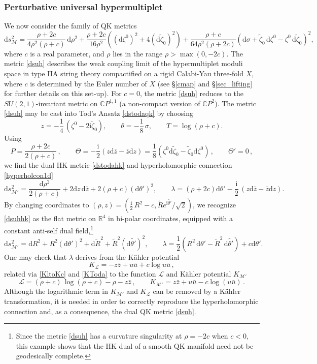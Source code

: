 \documentclass[12pt,reqno]{article}
\numberwithin{equation}{section}
\newcommand{\be}{\begin{equation}}
\newcommand{\ee}{\end{equation}}
\def\({\left(}
\def\){\right)}
\def\hf{\frac{1}{2}}
\def\bz{\bar z}
\def\bu{\bar u}
\renewcommand{\d}{\mathrm{d}}
\newcommand{\de}{\mathrm{d}}
\newcommand{\I}{\mathrm{i}}
\newcommand{\cL}{\mathcal{L}}
\newcommand{\cM}{\mathcal{M}}
\newcommand{\IR}{\mathbb{R}}
\newcommand{\IC}{\mathbb{C}}
\newcommand{\lb}{\mathscr{L}}
\newcommand{\tzeta}{{\tilde\zeta}}
\newcommand{\kahler}{{K\"ahler}\xspace}
\def\sigp{{\theta}}
\def\phip{{\theta'}}
\def\pTheta{\Theta'}
\def\pcM{\cM'}
\def\Kc{K} %
\def\conhyper{\lambda}
\numberwithin{equation}{section}
\begin{document}
\subsubsection*{\bf Perturbative universal hypermultiplet}

We now consider the family of QK metrics  \cite{Antoniadis:2003sw}
\be
\label{dsuh}
\de s^2_\cM = \frac{\rho+2c}{4\rho^2(\rho+c)}\,\de \rho^2
+\frac{\rho+2c}{16 \rho^2} \( (\d\zeta^0)^2+4 (\de\tzeta_0)^2\)
+ \frac{\rho+c}{64 \rho^2(\rho+2c)} (\de\sigma+\tzeta_0\,\de\zeta^0- \zeta^0\, \de\tzeta_0)^2 ,
\ee
where $c$ is a real parameter, and $\rho$ lies in the range $\rho>\max(0,-2c)$.
The metric \eqref{dsuh} describes the weak coupling limit of the hypermultiplet moduli
space in type IIA string theory compactified on a rigid Calabi-Yau three-fold $X$,
where $c$ is determined by the Euler number of $X$
(see \S\ref{cmap} and \S\ref{sec_lifting} for further details on this set-up). For $c=0$,
the metric \eqref{dsuh} reduces to the $SU(2,1)$-invariant metric
on $\IC P^{1,1}$ (a non-compact version of $\IC P^2$).
The metric \eqref{dsuh} may be cast into Tod's Ansatz \eqref{dstodaqk}
by choosing
\be
\label{TodaUH}
z=-\frac14\,(\zeta^0-2\I\tzeta_0),
\qquad
\sigp=-\frac18\, \sigma ,
\qquad
T=\log(\rho +c) .
\ee
Using
\be
P=\frac{\rho+2c}{2(\rho+c)}\, ,
\qquad
\Theta=-\frac{\I}{2} ( z \de \bar z - \bar z \de z)=\frac18(\zeta^0\de\tzeta_0-\tzeta_0\de\zeta^0)\, ,
\qquad
\pTheta=0\, ,
\ee
we find the dual HK metric \eqref{dstodahk} and hyperholomorphic connection
\eqref{hyperholcon1d}
\be
\label{dsuhhk}
\de s_{\pcM}^2 = \frac{\de\rho^2}{2(\rho+c)}+2\de z\,\de\bz+2(\rho+c)(\de\phip)^2,
\qquad
\conhyper = (\rho+2c) \de \phip   -\frac{\I}{2}\, ( z \de \bar z - \bar z \de z) .
\ee
By changing coordinates to $(\rho,z)=(\hf\, R^2-c,\tilde R e^{\I\tilde\phip}/\sqrt{2})$, we recognize
\eqref{dsuhhk} as the flat metric on $\IR^4$ in bi-polar coordinates, equipped
with a constant anti-self dual field,\footnote{Since the metric \eqref{dsuh} has a curvature
singularity at $\rho=-2c$ when $c<0$, this example shows that the HK dual of a smooth
QK manifold need not be geodesically complete.}
\be
\label{UHflat}
\de s^2_{\pcM}=\de R^2+R^2(\de\phip)^2+\de \tilde R^2+\tilde R^2(\de \tilde\phip)^2,
\qquad
\conhyper=\hf\( R^2\, \de\phip-\tilde R^2\, \de\tilde\phip\)+c \de\phip .
\ee
One may check that $\lambda$ derives from the K\"ahler potential
\be
K_{\lb}=-z\bar z+u\bu +c\log u\bu\, ,
\ee
related via  \eqref{KltoKc} and \eqref{KToda} to the function $\cL$
and \kahler potential $\Kc_{\pcM}$
\be
\cL=(\rho+c)\, \log(\rho+c)-\rho-z\bz\, ,
\qquad
\Kc_{\pcM}
=z\bz+u\bu-c\log (u\bu)
\, .
\ee
Although the logarithmic term in $\Kc_{\pcM}$ and $K_\lb$ can be removed by a K\"ahler transformation,
it is needed in order to correctly reproduce the hyperholomorphic connection and, as a consequence,
the dual QK metric \eqref{dsuh}.
\end{document}
